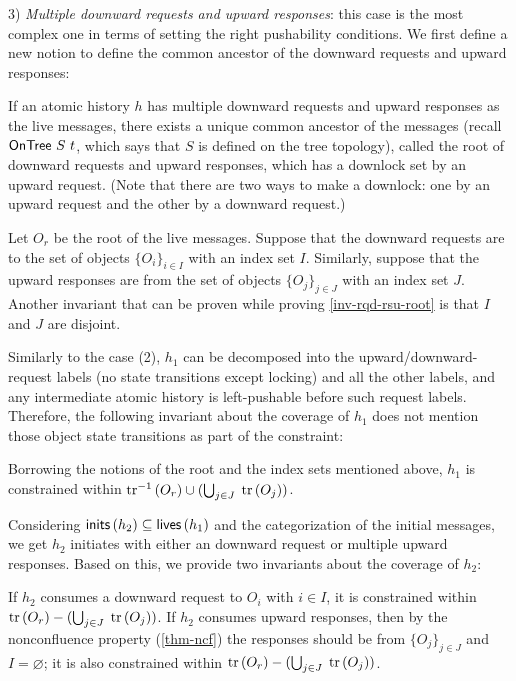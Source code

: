 3) \emph{Multiple downward requests and upward responses}: this case is the most complex one in terms of setting the right pushability conditions.
We first define a new notion to define the common ancestor of the downward requests and upward responses:
\begin{invariant}\label{inv-rqd-rsu-root}
  If an atomic history $h$ has multiple downward requests and upward responses as the live messages, there exists a unique common ancestor of the messages (recall $\mathsf{OnTree}\ S\ t$, which says that $S$ is defined on the tree topology), called the root of downward requests and upward responses, which has a downlock set by an upward request.
  (Note that there are two ways to make a downlock: one by an upward request and the other by a downward request.)
\end{invariant}
Let $O_r$ be the root of the live messages.
Suppose that the downward requests are to the set of objects $\{O_i\}_{i \in I}$ with an index set $I$.
Similarly, suppose that the upward responses are from the set of objects $\{O_j\}_{j \in J}$ with an index set $J$.
Another invariant that can be proven while proving \autoref{inv-rqd-rsu-root} is that $I$ and $J$ are disjoint.

Similarly to the case (2), $h_1$ can be decomposed into the upward/downward-request labels (no state transitions except locking) and all the other labels, and any intermediate atomic history is left-pushable before such request labels.
Therefore, the following invariant about the coverage of $h_1$ does not mention those object state transitions as part of the constraint:
\begin{invariant}\label{inv-rqd-rsu-live}
  Borrowing the notions of the root and the index sets mentioned above, $h_1$ is constrained within $\textrm{tr}^{-1}\,(O_r) \cup (\bigcup_{j \in J}\; \textrm{tr}\,(O_j))$.
\end{invariant}

Considering $\mathsf{inits}\,(h_2) \subseteq \mathsf{lives}\,(h_1)$ and the categorization of the initial messages, we get $h_2$ initiates with either an downward request or multiple upward responses.
Based on this, we provide two invariants about the coverage of $h_2$:
\begin{invariant}\label{inv-rqd-rsu-init}
  If $h_2$ consumes a downward request to $O_i$ with $i \in I$, it is constrained within $\textrm{tr}\,(O_r) - (\bigcup_{j \in J}\; \textrm{tr}\,(O_j))$.
  If $h_2$ consumes upward responses, then by the nonconfluence property (\autoref{thm-ncf}) the responses should be from $\{O_j\}_{j \in J}$ and $I = \varnothing$; it is also constrained within $\textrm{tr}\,(O_r) - (\bigcup_{j \in J}\; \textrm{tr}\,(O_j))$.
\end{invariant}

